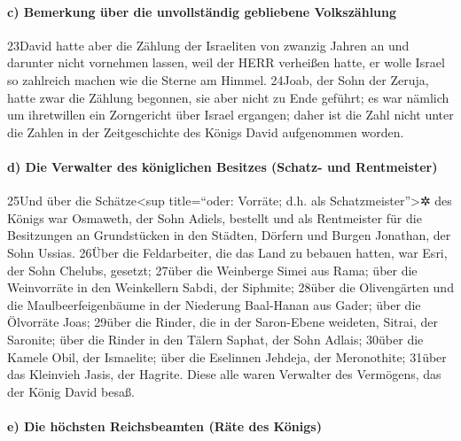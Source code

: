 \hypertarget{c-bemerkung-uxfcber-die-unvollstuxe4ndig-gebliebene-volkszuxe4hlung}{%
\paragraph{c) Bemerkung über die unvollständig gebliebene
Volkszählung}\label{c-bemerkung-uxfcber-die-unvollstuxe4ndig-gebliebene-volkszuxe4hlung}}

23David hatte aber die Zählung der Israeliten von zwanzig Jahren an und
darunter nicht vornehmen lassen, weil der HERR verheißen hatte, er wolle
Israel so zahlreich machen wie die Sterne am Himmel. 24Joab, der Sohn
der Zeruja, hatte zwar die Zählung begonnen, sie aber nicht zu Ende
geführt; es war nämlich um ihretwillen ein Zorngericht über Israel
ergangen; daher ist die Zahl nicht unter die Zahlen in der
Zeitgeschichte des Königs David aufgenommen worden.

\hypertarget{d-die-verwalter-des-kuxf6niglichen-besitzes-schatz--und-rentmeister}{%
\paragraph{d) Die Verwalter des königlichen Besitzes (Schatz- und
Rentmeister)}\label{d-die-verwalter-des-kuxf6niglichen-besitzes-schatz--und-rentmeister}}

25Und über die Schätze\textless sup title=``oder: Vorräte; d.h. als
Schatzmeister''\textgreater✲ des Königs war Osmaweth, der Sohn Adiels,
bestellt und als Rentmeister für die Besitzungen an Grundstücken in den
Städten, Dörfern und Burgen Jonathan, der Sohn Ussias. 26Über die
Feldarbeiter, die das Land zu bebauen hatten, war Esri, der Sohn
Chelubs, gesetzt; 27über die Weinberge Simei aus Rama; über die
Weinvorräte in den Weinkellern Sabdi, der Siphmite; 28über die
Olivengärten und die Maulbeerfeigenbäume in der Niederung Baal-Hanan aus
Gader; über die Ölvorräte Joas; 29über die Rinder, die in der
Saron-Ebene weideten, Sitrai, der Saronite; über die Rinder in den
Tälern Saphat, der Sohn Adlais; 30über die Kamele Obil, der Ismaelite;
über die Eselinnen Jehdeja, der Meronothite; 31über das Kleinvieh Jasis,
der Hagrite. Diese alle waren Verwalter des Vermögens, das der König
David besaß.

\hypertarget{e-die-huxf6chsten-reichsbeamten-ruxe4te-des-kuxf6nigs}{%
\paragraph{e) Die höchsten Reichsbeamten (Räte des
Königs)}\label{e-die-huxf6chsten-reichsbeamten-ruxe4te-des-kuxf6nigs}}

